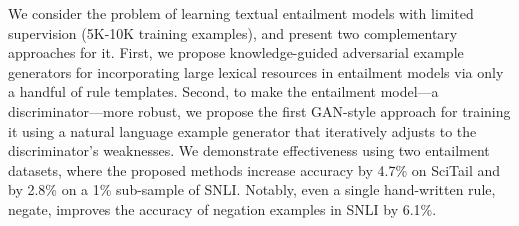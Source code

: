 We consider the problem of learning textual entailment models with limited supervision (5K-10K training examples), and present two complementary approaches for it. First, we propose knowledge-guided adversarial example generators for incorporating large lexical resources in entailment models via only a handful of rule templates. Second, to make the entailment model—a discriminator—more robust, we propose the first GAN-style approach for training it using a natural language example generator that iteratively adjusts to the discriminator's weaknesses. We demonstrate effectiveness using two entailment datasets, where the proposed methods increase accuracy by 4.7\% on SciTail and by 2.8\% on a 1\% sub-sample of SNLI. Notably, even a single hand-written rule, negate, improves the accuracy of negation examples in SNLI by 6.1\%.
